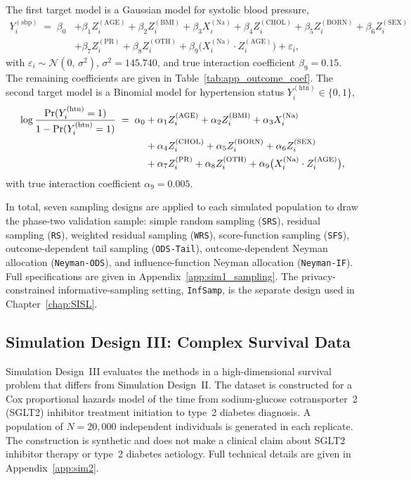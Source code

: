 The first target model is a Gaussian model for systolic blood pressure,
\begin{align}
    Y_i^{(\mathrm{sbp})} \;=\; \beta_0
    &+ \beta_1 Z_i^{(\mathrm{AGE})}
    + \beta_2 Z_i^{(\mathrm{BMI})}
    + \beta_3 X_i^{(\mathrm{Na})}
    + \beta_4 Z_i^{(\mathrm{CHOL})}
    + \beta_5 Z_i^{(\mathrm{BORN})}
    + \beta_6 Z_i^{(\mathrm{SEX})} \nonumber \\
    &+ \beta_7 Z_i^{(\mathrm{PR})}
    + \beta_8 Z_i^{(\mathrm{OTH})}
    + \beta_9 \bigl(X_i^{(\mathrm{Na})} \cdot Z_i^{(\mathrm{AGE})}\bigr)
    + \varepsilon_i,
    \label{eq:app_sbp_model}
\end{align}
with $\varepsilon_i \sim \mathcal{N}(0,\, \sigma^2)$, $\sigma^2 = 145.740$, and true interaction coefficient $\beta_9 = 0.15$. The remaining coefficients are given in Table~\ref{tab:app_outcome_coef}. The second target model is a Binomial model for hypertension status $Y_i^{(\mathrm{htn})} \in \{0,1\}$,
\begin{align}
    \log \frac{\Pr(Y_i^{(\mathrm{htn})} = 1)}{%
              1 - \Pr(Y_i^{(\mathrm{htn})} = 1)}
    \;=\; \alpha_0
    &+ \alpha_1 Z_i^{(\mathrm{AGE})}
    + \alpha_2 Z_i^{(\mathrm{BMI})}
    + \alpha_3 X_i^{(\mathrm{Na})} \nonumber \\
    & + \alpha_4 Z_i^{(\mathrm{CHOL})}
    + \alpha_5 Z_i^{(\mathrm{BORN})}
    + \alpha_6 Z_i^{(\mathrm{SEX})} \nonumber \\
    & + \alpha_7 Z_i^{(\mathrm{PR})}
    + \alpha_8 Z_i^{(\mathrm{OTH})}
    + \alpha_9 \bigl(X_i^{(\mathrm{Na})} \cdot Z_i^{(\mathrm{AGE})}\bigr),
    \label{eq:app_htn_model}
\end{align}
with true interaction coefficient $\alpha_9 = 0.005$.

In total, seven sampling designs are applied to each simulated population to draw the phase-two validation sample: simple random sampling (\texttt{SRS}), residual sampling (\texttt{RS}), weighted residual sampling (\texttt{WRS}), score-function sampling (\texttt{SFS}), outcome-dependent tail sampling (\texttt{ODS-Tail}), outcome-dependent Neyman allocation (\texttt{Neyman-ODS}), and influence-function Neyman allocation (\texttt{Neyman-IF}). Full specifications are given in Appendix~\ref{app:sim1_sampling}. The privacy-constrained informative-sampling setting, \texttt{InfSamp}, is the separate design used in Chapter~\ref{chap:SISL}.

\subsection{Simulation Design III: Complex Survival Data}
\label{sec:sim2context}
Simulation Design~III evaluates the methods in a high-dimensional survival problem that differs from Simulation Design~II. The dataset is constructed for a Cox proportional hazards model of the time from sodium-glucose cotransporter~2 (SGLT2) inhibitor treatment initiation to type~2 diabetes diagnosis. A population of $N = 20{,}000$ independent individuals is generated in each replicate. The construction is synthetic and does not make a clinical claim about SGLT2 inhibitor therapy or type~2 diabetes aetiology. Full technical details are given in Appendix~\ref{app:sim2}.

